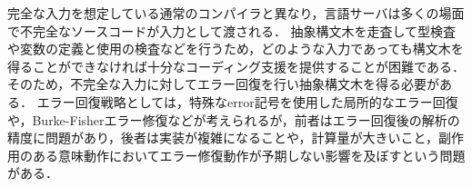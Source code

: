 \documentclass[fontsize=9bp,twocolumn,column_gap=2.36zw,a4paper,report]{jlreq}
\begin{document}
完全な入力を想定している通常のコンパイラと異なり，言語サーバは多くの場面で不完全なソースコードが入力として渡される．
抽象構文木を走査して型検査や変数の定義と使用の検査などを行うため，どのような入力であっても構文木を得ることができなければ十分なコーディング支援を提供することが困難である．
そのため，不完全な入力に対してエラー回復を行い抽象構文木を得る必要がある．
エラー回復戦略としては，特殊なerror記号を使用した局所的なエラー回復や，Burke-Fisherエラー修復などが考えられるが，前者はエラー回復後の解析の精度に問題があり，後者は実装が複雑になることや，計算量が大きいこと，副作用のある意味動作においてエラー修復動作が予期しない影響を及ぼすという問題がある．

\begin{figure}[h]
\end{figure}


\begin{figure}[h]
\end{figure}
\end{document}
